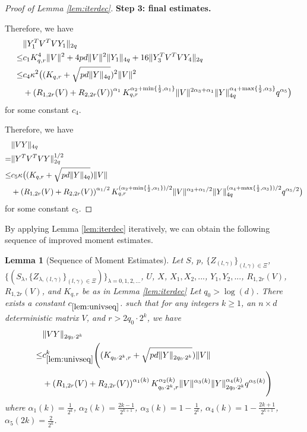 \documentclass[11pt]{amsart}
\numberwithin{equation}{section}
\numberwithin{equation}{section}
\DeclarePairedDelimiter{\norm}{\lVert}{\rVert}
\newtheorem{lemma}[theorem]{Lemma}
\begin{document}
\begin{proof}[Proof of Lemma \ref{lem:iterdec}]
\textbf{Step 3: final estimates.}

Therefore, we have
\begin{align*}
    &\norm{Y_1^TV^TVY_1}_{2q}  \\\le & c_1 K_{q,r}^4 \norm{V}^2 + 4pd\norm{V}^2 \norm{Y_1}_{4q}+ 16 \norm{Y_3^TV^TVY_4}_{2q}
    \\ \le & c_4 \kappa^2 \big((K_{q,r}+\sqrt{pd\norm{Y}_{4q}})^2 \norm{V}^2 \\&+ \left(R_{1,2r}(V)+R_{2,2r}(V)\right)^{\alpha_1}K_{q,r}^{\alpha_2+\min\{\frac{1}{2},\alpha_1\}}\norm{V}^{2\alpha_3+\alpha_1} \norm{Y}_{4q}^{\alpha_4+\max\{\frac{1}{2},\alpha_3\}}q^{\alpha_5} \big)
\end{align*}
for some constant $c_4$.

Therefore, we have
\begin{align*}
    &\norm{VY}_{4q}
\\=&\norm{Y^TV^TVY}_{2q}^{1/2}
 \\ \le & c_5 \kappa \big((K_{q,r}+\sqrt{pd\norm{Y}_{4q}}) \norm{V} \\&+ \left(R_{1,2r}(V)+R_{2,2r}(V)\right)^{\alpha_1/2}K_{q,r}^{(\alpha_2+\min\{\frac{1}{2},\alpha_1\})/2}\norm{V}^{\alpha_3+\alpha_1/2} \norm{Y}_{4q}^{(\alpha_4+\max\{\frac{1}{2},\alpha_3\})/2}q^{\alpha_5/2} \big)
\end{align*}
for some constant $c_5$.






\end{proof}

By applying Lemma \ref{lem:iterdec} iteratively, we can obtain the following sequence of improved moment estimates.

\begin{lemma}[Sequence of Moment Estimates]\label{lem:univseq}
Let $S$, $p$, $\{Z_{(l,\gamma)}\}_{(l,\gamma) \in \Xi}$, $\{(S_{\lambda},\{Z_{\lambda,(l,\gamma)}\}_{(l,\gamma) \in \Xi})\}_{\lambda=0,1,2,...}$, $U$, $X$, $X_1,X_2,...$, $Y_1,Y_2,...$, $R_{1,2r}(V)$, $R_{1,2r}(V)$, and $K_{q,r}$ be as in Lemma \ref{lem:iterdec}
Let $q_0 > \log(d)$.
There exists a constant $c_{\ref{lem:univseq}}$.
such that for any integers $k \ge 1$, an $n \times d$ deterministic matrix $V$, and $r>2q_0\cdot 2^k$, we have
\begin{equation}\label{eq:univseq}
    \begin{aligned}
    &\norm{VY}_{2q_0\cdot 2^k} \\\le& c_{\ref{lem:univseq}}^k \Bigg((K_{q_0 \cdot 2^k,r}+\sqrt{pd\norm{Y}_{2q_0\cdot 2^k}})\norm{V} \\&+ \left(R_{1,2r}(V)+R_{2,2r}(V)\right)^{\alpha_1(k)}K_{q_0 \cdot 2^k,r}^{\alpha_2(k)}\norm{V}^{\alpha_3(k)} \norm{Y}_{2q_0 \cdot 2^k}^{\alpha_4(k)}q^{\alpha_5(k)}\Bigg)
\end{aligned}
\end{equation}
where $\alpha_1(k)=\frac{1}{2^k}$, $\alpha_2(k)=\frac{2k-1}{2^{k+1}}$, $\alpha_3(k)=1-\frac{1}{2^k}$, $\alpha_4(k)=1-\frac{2k+1}{2^{k+1}}$, $\alpha_5(2k)=\frac{2}{2^k}$.

\end{lemma}
\end{document}
